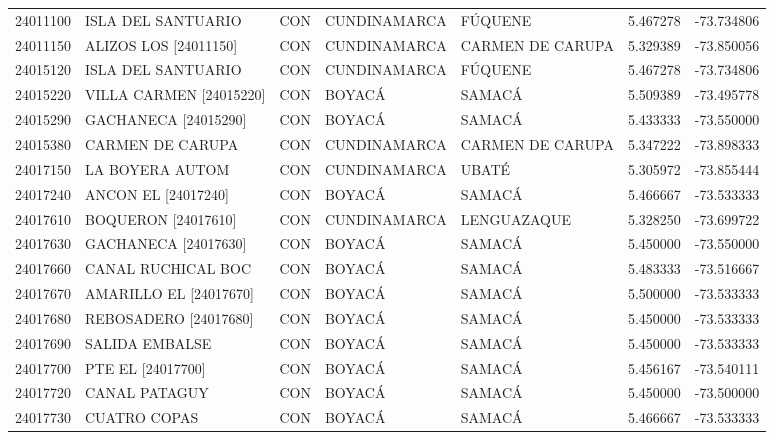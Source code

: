 \begin{longtable}{rllllrr}
 24011100 &          ISLA DEL SANTUARIO &  CON &     CUNDINAMARCA &           FÚQUENE &  5.467278 & -73.734806 \\
 24011150 &       ALIZOS LOS [24011150] &  CON &     CUNDINAMARCA &  CARMEN DE CARUPA &  5.329389 & -73.850056 \\
 24015120 &          ISLA DEL SANTUARIO &  CON &     CUNDINAMARCA &           FÚQUENE &  5.467278 & -73.734806 \\
 24015220 &   VILLA CARMEN   [24015220] &  CON &           BOYACÁ &            SAMACÁ &  5.509389 & -73.495778 \\
 24015290 &        GACHANECA [24015290] &  CON &           BOYACÁ &            SAMACÁ &  5.433333 & -73.550000 \\
 24015380 &            CARMEN DE CARUPA &  CON &     CUNDINAMARCA &  CARMEN DE CARUPA &  5.347222 & -73.898333 \\
 24017150 &             LA BOYERA AUTOM &  CON &     CUNDINAMARCA &             UBATÉ &  5.305972 & -73.855444 \\
 24017240 &         ANCON EL [24017240] &  CON &           BOYACÁ &            SAMACÁ &  5.466667 & -73.533333 \\
 24017610 &      BOQUERON    [24017610] &  CON &     CUNDINAMARCA &       LENGUAZAQUE &  5.328250 & -73.699722 \\
 24017630 &        GACHANECA [24017630] &  CON &           BOYACÁ &            SAMACÁ &  5.450000 & -73.550000 \\
 24017660 &          CANAL RUCHICAL BOC &  CON &           BOYACÁ &            SAMACÁ &  5.483333 & -73.516667 \\
 24017670 &      AMARILLO EL [24017670] &  CON &           BOYACÁ &            SAMACÁ &  5.500000 & -73.533333 \\
 24017680 &       REBOSADERO [24017680] &  CON &           BOYACÁ &            SAMACÁ &  5.450000 & -73.533333 \\
 24017690 &              SALIDA EMBALSE &  CON &           BOYACÁ &            SAMACÁ &  5.450000 & -73.533333 \\
 24017700 &           PTE EL [24017700] &  CON &           BOYACÁ &            SAMACÁ &  5.456167 & -73.540111 \\
 24017720 &               CANAL PATAGUY &  CON &           BOYACÁ &            SAMACÁ &  5.450000 & -73.500000 \\
 24017730 &                CUATRO COPAS &  CON &           BOYACÁ &            SAMACÁ &  5.466667 & -73.533333 \\

\end{longtable}
